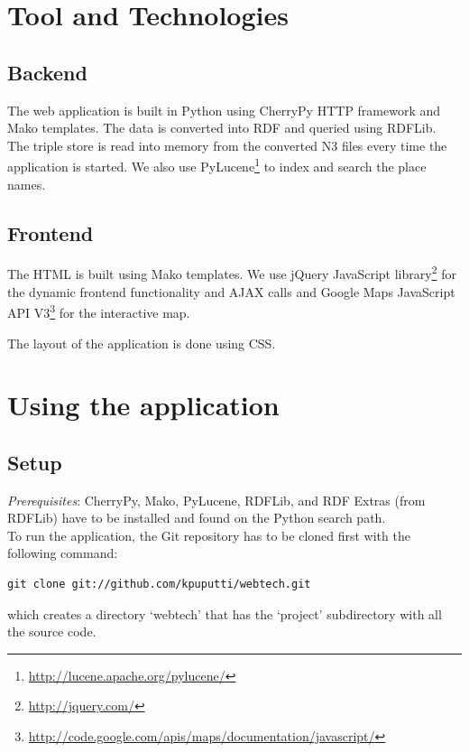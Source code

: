 \documentclass[a4paper,12pt]{article}
\begin{document}
\section{Tool and Technologies}

\subsection{Backend}

The web application is built in Python using CherryPy HTTP framework
and Mako templates. The data is converted into RDF and queried using
RDFLib. The triple store is read into memory from the converted N3
files every time the application is started. We also use
PyLucene\footnote{\url{http://lucene.apache.org/pylucene/}} to index
and search the place names.

\subsection{Frontend}

The HTML is built using Mako templates. We use jQuery JavaScript
library\footnote{\url{http://jquery.com/}} for the dynamic frontend
functionality and AJAX calls and Google Maps JavaScript API
V3\footnote{\url{http://code.google.com/apis/maps/documentation/javascript/}}
for the interactive map.

The layout of the application is done using CSS.

\section{Using the application}

\subsection{Setup}

\noindent \textit{Prerequisites}: CherryPy, Mako, PyLucene, RDFLib,
and RDF Extras (from RDFLib) have to be installed and found on the
Python search path.\\

\noindent To run the application, the Git repository has to be cloned
first with the following command:

\begin{verbatim}
git clone git://github.com/kpuputti/webtech.git
\end{verbatim}

\noindent which creates a directory `webtech' that has the `project'
subdirectory with all the source code.
\end{document}
